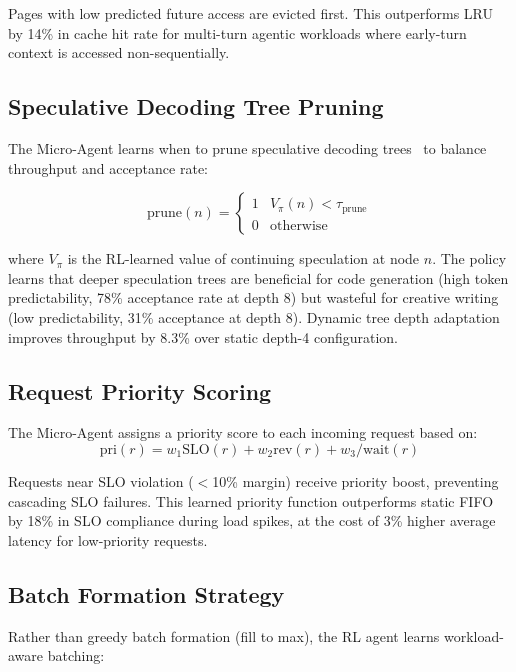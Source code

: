 \documentclass[conference,10pt]{IEEEtran}
\begin{document}
Pages with low predicted future access are evicted first. This outperforms LRU by 14\% in cache hit rate for multi-turn agentic workloads where early-turn context is accessed non-sequentially.


\subsection{Speculative Decoding Tree Pruning}

The Micro-Agent learns when to prune speculative decoding trees~\cite{patel2024splitwise} to balance throughput and acceptance rate:

\begin{equation}
\text{prune}(n) {=} \begin{cases} 1 & V_\pi(n) < \tau_{\text{prune}} \\ 0 & \text{otherwise} \end{cases}
\end{equation}

where $V_\pi$ is the RL-learned value of continuing speculation at node $n$. The policy learns that deeper speculation trees are beneficial for code generation (high token predictability, 78\% acceptance rate at depth 8) but wasteful for creative writing (low predictability, 31\% acceptance at depth 8). Dynamic tree depth adaptation improves throughput by 8.3\% over static depth-4 configuration.

\subsection{Request Priority Scoring}

The Micro-Agent assigns a priority score to each incoming request based on:
\begin{equation}
\text{pri}(r) = w_1 \text{SLO}(r) + w_2 \text{rev}(r) + w_3 / \text{wait}(r)
\end{equation}

Requests near SLO violation ($<$10\% margin) receive priority boost, preventing cascading SLO failures. This learned priority function outperforms static FIFO by 18\% in SLO compliance during load spikes, at the cost of 3\% higher average latency for low-priority requests.

\subsection{Batch Formation Strategy}

Rather than greedy batch formation (fill to max), the RL agent learns workload-aware batching:
\end{document}

